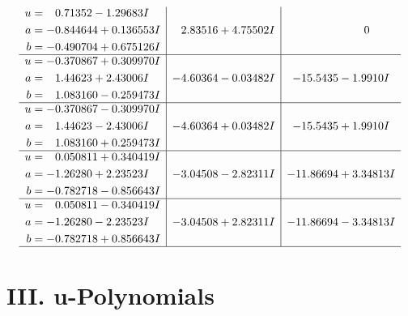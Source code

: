 \documentclass[1p]{elsarticle_modified}
\theoremstyle{definition}
\begin{document}
$$\begin{array}{c|c|c}
\begin{aligned}
u &= \phantom{-}0.71352 - 1.29683 I \\
a &= -0.844644 + 0.136553 I \\
b &= -0.490704 + 0.675126 I\end{aligned}
 & \phantom{-}2.83516 + 4.75502 I & \phantom{-0.000000 } 0 \\ \hline\begin{aligned}
u &= -0.370867 + 0.309970 I \\
a &= \phantom{-}1.44623 + 2.43006 I \\
b &= \phantom{-}1.083160 - 0.259473 I\end{aligned}
 & -4.60364 - 0.03482 I & -15.5435 - 1.9910 I \\ \hline\begin{aligned}
u &= -0.370867 - 0.309970 I \\
a &= \phantom{-}1.44623 - 2.43006 I \\
b &= \phantom{-}1.083160 + 0.259473 I\end{aligned}
 & -4.60364 + 0.03482 I & -15.5435 + 1.9910 I \\ \hline\begin{aligned}
u &= \phantom{-}0.050811 + 0.340419 I \\
a &= -1.26280 + 2.23523 I \\
b &= -0.782718 - 0.856643 I\end{aligned}
 & -3.04508 - 2.82311 I & -11.86694 + 3.34813 I \\ \hline\begin{aligned}
u &= \phantom{-}0.050811 - 0.340419 I \\
a &= -1.26280 - 2.23523 I \\
b &= -0.782718 + 0.856643 I\end{aligned}
 & -3.04508 + 2.82311 I & -11.86694 - 3.34813 I\\
 \hline 
 \end{array}$$\newpage
\newpage\renewcommand{\arraystretch}{1}
\centering \section*{ III. u-Polynomials}
\end{document}
